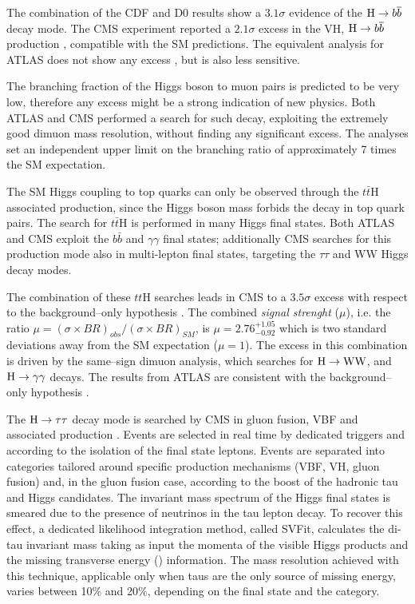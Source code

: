 The combination of the CDF and D0 results \cite{Aaltonen:2012qt} show a $3.1\sigma$ evidence of the $\mathrm{H} \rightarrow b \overline{b}$ decay mode. The CMS experiment reported a $2.1\sigma$ excess in the VH, $\mathrm{H} \rightarrow b \overline{b}$ production \cite{Chatrchyan:2013zna}, compatible with the SM predictions. The equivalent analysis for ATLAS does not show any excess \cite{TheATLAScollaboration:2013lia}, but is also less sensitive.

The branching fraction of the Higgs boson to muon pairs is predicted to be very low, therefore any excess might be a strong indication of new physics. Both ATLAS \cite{Aad:2014xva} and CMS \cite{CMS:2013aga} performed a search for such decay, exploiting the extremely good dimuon mass resolution, without finding any significant excess. The analyses set an independent upper limit on the branching ratio of approximately 7 times the SM expectation.

The SM Higgs coupling to top quarks can only be observed through the $t\bar{t}$H associated production, since the Higgs boson mass forbids the decay in top quark pairs. The search for $t\bar{t}$H \cite{ATLASCONF:2014043,CMS:2014ega} is performed in many Higgs final states. Both ATLAS and CMS exploit the $b\bar{b}$ and $\gamma\gamma$ final states; additionally CMS searches for this production mode also in multi-lepton final states, targeting the $\tau\tau$ and WW Higgs decay modes.

The combination of these $tt$H searches leads in CMS to a $3.5\sigma$ excess with respect to the background--only hypothesis \cite{CMS:2014ega}. The combined \emph{signal strenght} ($\mu$), i.e. the ratio $\mu = (\sigma \times BR)_{obs} / (\sigma \times BR)_{SM}$, is $\mu = 2.76^{+1.05}_{-0.92}$ which is two standard deviations away from the SM expectation ($\mu = 1$). The excess in this combination is driven by the same--sign dimuon analysis, which searches for $\mathrm{H}\rightarrow \mathrm{W}\mathrm{W}$, and $\mathrm{H}\rightarrow\gamma\gamma$ decays. The results from ATLAS are consistent with the background--only hypothesis \cite{ATLASCONF:2014043}.

The $\mathrm{H} \to \tau \tau$ decay mode is searched by CMS in gluon fusion, VBF and associated production \cite{H_tautau}. Events are selected in real time by dedicated triggers and according to the isolation of the final state leptons. Events are separated into categories tailored around specific production mechanisms (VBF, VH, gluon fusion) and, in the gluon fusion case, according to the boost of the hadronic tau and Higgs candidates. The invariant mass spectrum of the Higgs final states is smeared due to the presence of neutrinos in the tau lepton decay. To recover this effect, a dedicated likelihood integration method, called SVFit, calculates the di-tau invariant mass taking as input the momenta of the visible Higgs products and the missing transverse energy (\MET) information. The mass resolution achieved with this technique, applicable only when taus are the only source of missing energy, varies between 10\% and 20\%, depending on the final state and the category.

